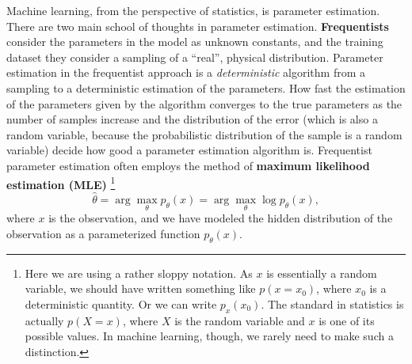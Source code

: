 \documentclass[hyperref, a4paper, 12pt]{report}
\newcommand*{\argmax}{\arg\max}
\newcommand*{\concept}[1]{{\textbf{#1}}}
\begin{document}
Machine learning, from the perspective of statistics, is parameter estimation.
There are two main school of thoughts in parameter estimation.
\concept{Frequentists} consider the parameters in the model as unknown constants,
and the training dataset they consider a sampling of a ``real'', physical distribution.
Parameter estimation in the frequentist approach is a \emph{deterministic} algorithm
from a sampling to a deterministic estimation of the parameters.
How fast the estimation of the parameters given by the algorithm
converges to the true parameters as the number of samples increase
and the distribution of the error (which is also a random variable,
because the probabilistic distribution of the sample is a random variable)
decide how good a parameter estimation algorithm is.
Frequentist parameter estimation often employs the method of \concept{maximum likelihood estimation (MLE)}%
\footnote{
    Here we are using a rather sloppy notation.
    As $x$ is essentially a random variable,
    we should have written something like $p(x = x_0)$, where $x_0$ is a deterministic quantity.
    Or we can write $p_{x}(x_0)$.
    The standard in statistics is actually $p(X = x)$,
    where $X$ is the random variable and $x$ is one of its possible values.
    In machine learning, though, we rarely need to make such a distinction.
}
\begin{equation}
    \hat{\theta} = \argmax_\theta p_\theta(x) = \argmax_\theta \log p_\theta(x),
    \label{eq:mle}
\end{equation}
where $x$ is the observation, and we have modeled the hidden distribution of the observation as a parameterized function $p_\theta(x)$.
\end{document}
